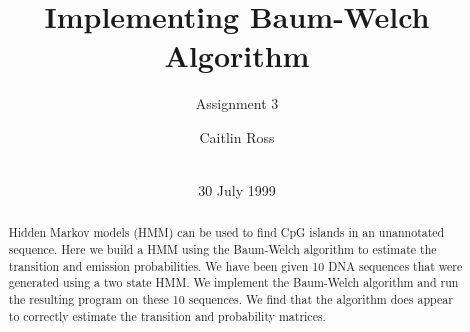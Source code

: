 \documentclass{acm_proc_article-sp}
\begin{document}
\title{Implementing Baum-Welch Algorithm}
\subtitle{Assignment 3}
%
%
%
%
%

%
\author{
	\alignauthor Caitlin Ross\\
	 \\
}

\date{30 July 1999}

\maketitle

\begin{abstract}
Hidden Markov models (HMM) can be used to find CpG islands in an unannotated sequence.  Here we build a HMM using the Baum-Welch algorithm to estimate the transition and emission probabilities.  We have been given 10 DNA sequences that were generated using a two state HMM.  We implement the Baum-Welch algorithm and run the resulting program on these 10 sequences.  We find that the algorithm does appear to correctly estimate the transition and probability matrices.
\end{abstract}
\end{document}
